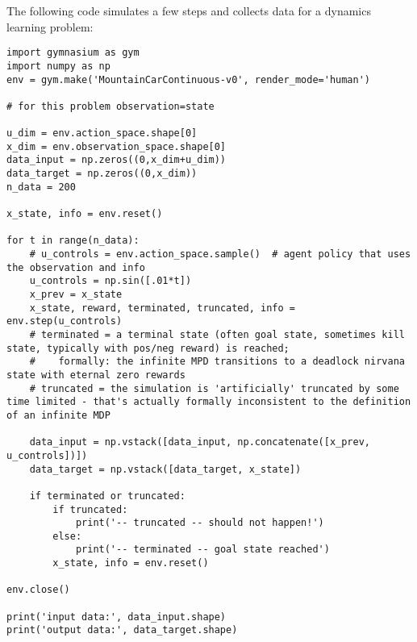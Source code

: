 The following code simulates a few steps and collects data for a dynamics learning problem:
\begin{code}
\begin{Verbatim}[numbers=none,fontsize=\footnotesize]
import gymnasium as gym
import numpy as np
env = gym.make('MountainCarContinuous-v0', render_mode='human')

# for this problem observation=state

u_dim = env.action_space.shape[0]
x_dim = env.observation_space.shape[0]
data_input = np.zeros((0,x_dim+u_dim))
data_target = np.zeros((0,x_dim))
n_data = 200

x_state, info = env.reset()

for t in range(n_data):
    # u_controls = env.action_space.sample()  # agent policy that uses the observation and info
    u_controls = np.sin([.01*t])
    x_prev = x_state
    x_state, reward, terminated, truncated, info = env.step(u_controls)
    # terminated = a terminal state (often goal state, sometimes kill state, typically with pos/neg reward) is reached;
    #    formally: the infinite MPD transitions to a deadlock nirvana state with eternal zero rewards
    # truncated = the simulation is 'artificially' truncated by some time limited - that's actually formally inconsistent to the definition of an infinite MDP

    data_input = np.vstack([data_input, np.concatenate([x_prev, u_controls])])
    data_target = np.vstack([data_target, x_state])

    if terminated or truncated:
        if truncated:
            print('-- truncated -- should not happen!')
        else:
            print('-- terminated -- goal state reached')
        x_state, info = env.reset()

env.close()

print('input data:', data_input.shape)
print('output data:', data_target.shape)
\end{Verbatim}
\end{code}

